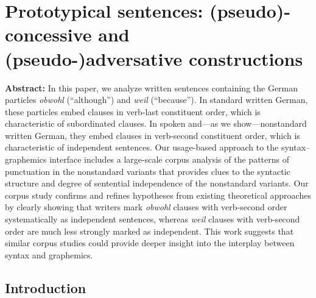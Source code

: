 \chapter{Prototypical sentences: (pseudo)-concessive and (pseudo-)adversative constructions}
\label{sec:clausesandphrases}

\textbf{Abstract:} In this paper, we analyze written sentences containing the German particles \textit{obwohl} (“although”) and \textit{weil} (“because”). In standard written German, these particles embed clauses in verb-last constituent order, which is characteristic of subordinated clauses. In spoken and—as we show—nonstandard written German, they embed clauses in verb-second constituent order, which is characteristic of independent sentences. Our usage-based approach to the syntax–graphemics interface includes a large-scale corpus analysis of the patterns of punctuation in the nonstandard variants that provides clues to the syntactic structure and degree of sentential independence of the nonstandard variants. Our corpus study confirms and refines hypotheses from existing theoretical approaches by clearly showing that writers mark \textit{obwohl} clauses with verb-second order systematically as independent sentences, whereas \textit{weil} clauses with verb-second order are much less strongly marked as independent. This work suggests that similar corpus studies could provide deeper insight into the interplay between syntax and graphemics.




\section{Introduction}




